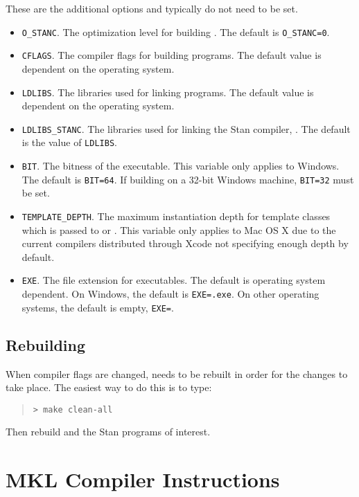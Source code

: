 These are the additional options and typically do not need to be set.
%
\begin{itemize}
  \item \Verb|O_STANC|. The optimization level for building
    . The default is \Verb|O_STANC=0|.
  \item \Verb|CFLAGS|. The compiler flags for building \CmdStan
    programs. The default value is dependent on the operating system.
  \item \Verb|LDLIBS|. The libraries used for linking \CmdStan
    programs. The default value is dependent on the operating system.
  \item \Verb|LDLIBS_STANC|. The libraries used for linking the Stan
    compiler, . The default is the value of \Verb|LDLIBS|.
  \item \Verb|BIT|. The bitness of the executable. This variable only
    applies to Windows. The default is \Verb|BIT=64|. If building on a
    32-bit Windows machine, \Verb|BIT=32| must be set.
  \item \Verb|TEMPLATE_DEPTH|. The maximum instantiation depth for
    template classes which is passed to \gpp or \clang. This variable
    only applies to Mac OS X due to the current compilers distributed
    through Xcode not specifying enough depth by default.
  \item \Verb|EXE|. The file extension for executables. The default is
    operating system dependent. On Windows, the default is
    \Verb|EXE=.exe|. On other operating systems, the default is empty,
    \Verb|EXE=|.
\end{itemize}
%

\subsection{Rebuilding \CmdStan}

When compiler flags are changed, \CmdStan needs to be rebuilt in order
for the changes to take place. The easiest way to do this is to type:
%
\begin{quote}
  \begin{Verbatim}[fontshape=sl]
> make clean-all
  \end{Verbatim}
\end{quote}
%
Then rebuild \CmdStan and the Stan programs of interest.


\section{MKL Compiler Instructions}

